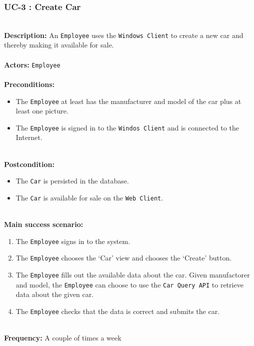 \subsubsection{UC-3 : Create Car}
\label{create-car-use-case}
\HRule \\[0.4cm]
\textbf{Description:} An \texttt{Employee} uses the \texttt{Windows Client} to create a new car and thereby making it available for sale. \\
\HRule \\[0.4cm]
\textbf{Actors:} \texttt{Employee}\\
\HRule \\[0.4cm]
\textbf{Preconditions:} 
\begin{itemize}
    \item The \texttt{Employee} at least has the manufacturer and model of the car plus at least one picture.
    \item The \texttt{Employee} is signed in to the \texttt{Windos Client} and is connected to the Internet.
\end{itemize}
\HRule \\[0.4cm]
\textbf{Postcondition:}
\begin{itemize}
    \item The \texttt{Car} is persisted in the database.
    \item The \texttt{Car} is available for sale on the \texttt{Web Client}.
\end{itemize}
\HRule \\[0.4cm]
\textbf{Main success scenario:}
\begin{enumerate}
    \item The \texttt{Employee} signs in to the system.
    \item The \texttt{Employee} chooses the `Car' view and chooses the `Create' button.
    \item The \texttt{Employee} fills out the available data about the car. Given manufactorer and model, the \texttt{Employee} can choose to use the \texttt{Car Query API} to retrieve data about the given car.
    \item The \texttt{Employee} checks that the data is correct and submits the car.
\end{enumerate}
\HRule \\[0.4cm]
\textbf{Frequency:}
A couple of times a week \\
\HRule \\[0.4cm]

